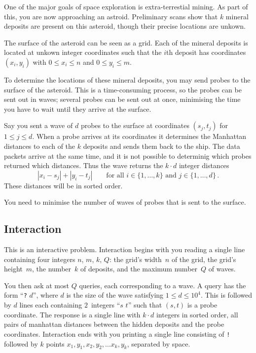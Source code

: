 
One of the major goals of space exploration is extra-terrestial mining. 
As part of this, you are now approaching an astroid. 
Preliminary scans show that $k$ mineral deposits are present on this asteroid, though their precise locations are unkown.

\medskip

The surface of the asteroid can be seen as a grid.
Each of the mineral deposits is located at unkown integer coordinates such that the $i$th deposit has coordinates $(x_i,y_i)$ with  $0 \le x_i \le n$ and $0\le y_i \le m$.

To determine the locations of these mineral deposits, you may send probes to the surface of the asteroid. 
This is a time-consuming process, so the probes can be sent out in waves;
several probes can be sent out at once, minimising the time you have to wait until they arrive at the surface.

Say you sent a wave of $d$ probes to the surface at coordinates $(s_j,t_j)$ for $1\leq j\leq d$.
When a probe arrives at its coordinates it determines the Manhattan distances to each of the $k$ deposits and sends them back to the ship. 
The data packets arrive at the same time, and it is not possible to determinig which probes returned which distances. 
Thus the wave returns the $k\cdot d$ integer distances
\[|x_i-s_j| + |y_i - t_j| \qquad\text{for all } i \in \{1,\ldots,k\} \text{ and } j \in\{ 1,\ldots,d\}\,.\]
These distances will be in sorted order.

You need to minimise the number of waves of probes that is sent to the surface.

\subsection*{Interaction}

This is an interactive problem.
Interaction begins with you reading a single line containing four integers $n$, $m$, $k$, $Q$:
the grid's width~$n$ of the grid,
the grid's height~$m$, the number~$k$ of deposits, and the maximum number~$Q$ of waves.

You then ask at most $Q$ queries, each corresponding to a wave.
A query has the form ``\texttt{?} $d$'', where $d$ is the size of the wave satisfying
$1\leq d\leq 10^4$. %
This is followed by $d$ lines each containing $2$~integers ``$s$ $t$'' such that $(s,t)$ is a probe coordinate.
The response is a single line with $k \cdot d$ integers in sorted order, all pairs of manhattan distances between the hidden deposits and the probe coordinates.
Interaction ends with you printing a single line consisting of \texttt{!} followed by $k$ points $x_1, y_1, x_2, y_2, \ldots x_k, y_k$, separated by space.

